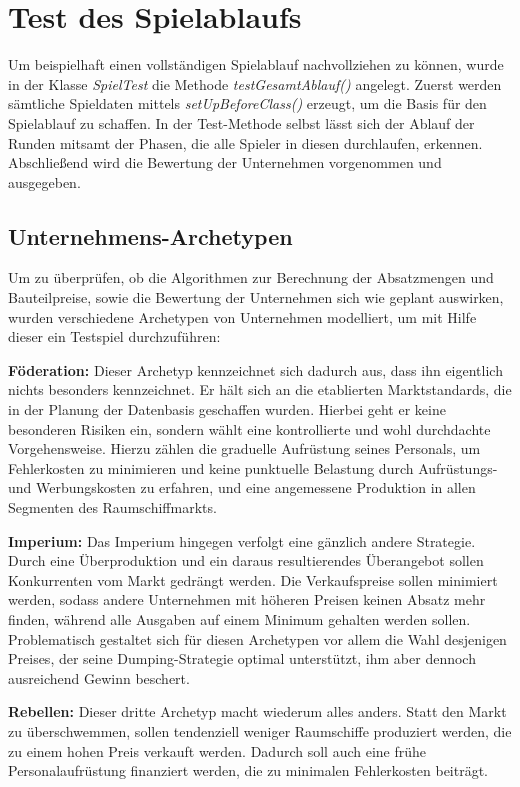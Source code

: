 \section{Test des Spielablaufs}
\label{sec:junit-spielablauf}


Um beispielhaft einen vollständigen Spielablauf nachvollziehen zu können, wurde in der Klasse \textit{SpielTest} die Methode \textit{testGesamtAblauf()} angelegt.
Zuerst werden sämtliche Spieldaten mittels \textit{setUpBeforeClass()} erzeugt, um die Basis für den Spielablauf zu schaffen. In der Test-Methode selbst lässt sich der Ablauf der Runden mitsamt der Phasen, die alle Spieler in diesen durchlaufen, erkennen. Abschließend wird die Bewertung der Unternehmen vorgenommen und ausgegeben.

\subsection{Unternehmens-Archetypen}
Um zu überprüfen, ob die Algorithmen zur Berechnung der Absatzmengen und Bauteilpreise, sowie die Bewertung der Unternehmen sich wie geplant auswirken, wurden verschiedene Archetypen von Unternehmen modelliert, um mit Hilfe dieser ein Testspiel durchzuführen:

\begin{seList}
\item \textbf{Föderation:} Dieser Archetyp kennzeichnet sich dadurch aus, dass ihn eigentlich nichts besonders kennzeichnet. Er hält sich an die etablierten Marktstandards, die in der Planung der Datenbasis geschaffen wurden. Hierbei geht er keine besonderen Risiken ein, sondern wählt eine kontrollierte und wohl durchdachte Vorgehensweise. Hierzu zählen die graduelle Aufrüstung seines Personals, um Fehlerkosten zu minimieren und keine punktuelle Belastung durch Aufrüstungs- und Werbungskosten zu erfahren, und eine angemessene Produktion in allen Segmenten des Raumschiffmarkts.
\item \textbf{Imperium:} Das Imperium hingegen verfolgt eine gänzlich andere Strategie. Durch eine Überproduktion und ein daraus resultierendes Überangebot sollen Konkurrenten vom Markt gedrängt werden. Die Verkaufspreise sollen minimiert werden, sodass andere Unternehmen mit höheren Preisen keinen Absatz mehr finden, während alle Ausgaben auf einem Minimum gehalten werden sollen. Problematisch gestaltet sich für diesen Archetypen vor allem die Wahl desjenigen Preises, der seine Dumping-Strategie optimal unterstützt, ihm aber dennoch ausreichend Gewinn beschert.
\item \textbf{Rebellen:} Dieser dritte Archetyp macht wiederum alles anders. Statt den Markt zu überschwemmen, sollen tendenziell weniger Raumschiffe produziert werden, die zu einem hohen Preis verkauft werden. Dadurch soll auch eine frühe Personalaufrüstung finanziert werden, die zu minimalen Fehlerkosten beiträgt.
\end{seList}


